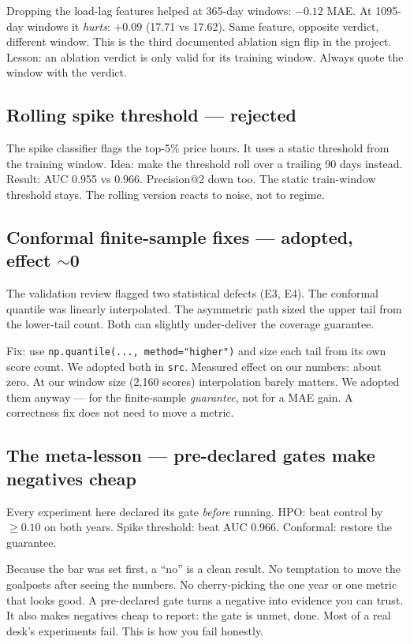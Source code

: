 Dropping the load-lag features helped at 365-day windows:
$-0.12$ MAE. At 1095-day windows it \emph{hurts}: $+0.09$
(17.71 vs 17.62). Same feature, opposite verdict, different window.
This is the third documented ablation sign flip in the project.
Lesson: an ablation verdict is only valid for its training window.
Always quote the window with the verdict.

\subsection{Rolling spike threshold --- rejected}

The spike classifier flags the top-5\% price hours.
It uses a static threshold from the training window.
Idea: make the threshold roll over a trailing 90 days instead.
Result: AUC 0.955 vs 0.966. Precision@2 down too.
The static train-window threshold stays.
The rolling version reacts to noise, not to regime.

\subsection{Conformal finite-sample fixes --- adopted, effect $\sim$0}

The validation review flagged two statistical defects (E3, E4).
The conformal quantile was linearly interpolated.
The asymmetric path sized the upper tail from the lower-tail count.
Both can slightly under-deliver the coverage guarantee.

Fix: use \texttt{np.quantile(..., method="higher")} and size each
tail from its own score count. We adopted both in \texttt{src}.
Measured effect on our numbers: about zero.
At our window size (2{,}160 scores) interpolation barely matters.
We adopted them anyway --- for the finite-sample \emph{guarantee},
not for a MAE gain. A correctness fix does not need to move a metric.

\subsection{The meta-lesson --- pre-declared gates make negatives cheap}

Every experiment here declared its gate \emph{before} running.
HPO: beat control by $\ge 0.10$ on both years.
Spike threshold: beat AUC 0.966. Conformal: restore the guarantee.

Because the bar was set first, a ``no'' is a clean result.
No temptation to move the goalposts after seeing the numbers.
No cherry-picking the one year or one metric that looks good.
A pre-declared gate turns a negative into evidence you can trust.
It also makes negatives cheap to report: the gate is unmet, done.
Most of a real desk's experiments fail. This is how you fail honestly.

